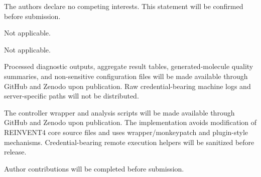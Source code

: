 \documentclass[referee,lineno,pdflatex,sn-basic]{sn-jnl}
\theoremstyle{thmstyleone}%
\theoremstyle{thmstyletwo}%
\theoremstyle{thmstylethree}%
\begin{document}
The authors declare no competing interests. This statement will be confirmed before submission.

Not applicable.

Not applicable.

Processed diagnostic outputs, aggregate result tables, generated-molecule quality summaries, and non-sensitive configuration files will be made available through GitHub and Zenodo upon publication. Raw credential-bearing machine logs and server-specific paths will not be distributed.

The controller wrapper and analysis scripts will be made available through GitHub and Zenodo upon publication. The implementation avoids modification of REINVENT4 core source files and uses wrapper/monkeypatch and plugin-style mechanisms. Credential-bearing remote execution helpers will be sanitized before release.

Author contributions will be completed before submission.
\end{document}
